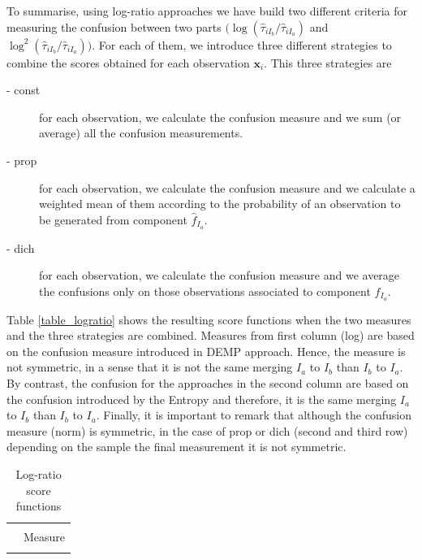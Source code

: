 \documentclass[10pt, a4paper]{article}
\newcommand{\m}[1]{\boldsymbol{#1}}
\begin{document}
\begin{spacing}{1.9}
To summarise, using log-ratio approaches we have build two different criteria for measuring the confusion between two parts $(\log ( \hat{\tau}_{iI_b} / \hat{\tau}_{iI_a}) $ and $\log^2 (\hat{\tau}_{iI_b} / \hat{\tau}_{iI_a} ))$. For each of them, we introduce three different strategies to combine the scores obtained for each observation $\m x_i$. This three strategies are
\begin{description}
\item[- const] for each observation, we calculate the confusion measure and we sum (or average) all the confusion measurements.
\item[- prop] for each observation, we calculate the confusion measure and we calculate a weighted mean of them according to the probability of an observation to be generated from component $\hat{f}_{I_a}$.
\item[- dich] for each observation, we calculate the confusion measure and we average the confusions only on those observations associated to component $\hat{f}_{I_a}$.
\end{description}

Table \ref{table_logratio} shows the resulting score functions when the two measures and the three strategies are combined. Measures from first column (log) are based on the confusion measure introduced in DEMP approach. Hence, the measure is not symmetric, in a sense that it is not the same merging $I_a$ to $I_b$ than $I_b$ to $I_a$. By contrast, the confusion for the approaches in the second column are based on the confusion introduced by the Entropy and therefore, it is the same merging $I_a$ to $I_b$ than $I_b$ to $I_a$. Finally, it is important to remark that although the confusion measure (norm) is symmetric, in the case of prop or dich (second and third row) depending on the sample the final measurement it is not symmetric.


\begin{table}[htpb]
\caption{Log-ratio score functions}
\begin{tabular}{c  c  c c }
 & \multicolumn{1}{c}{} & \multicolumn{1}{c}{}  & \multicolumn{1}{c}{} \\
  & \multicolumn{3}{c}{Measure} \\
\hline
 & \multicolumn{1}{c}{} & \multicolumn{1}{c}{} &  \multicolumn{1}{c}{} \\


\end{tabular}
\end{table}
\end{spacing}
\end{document}

